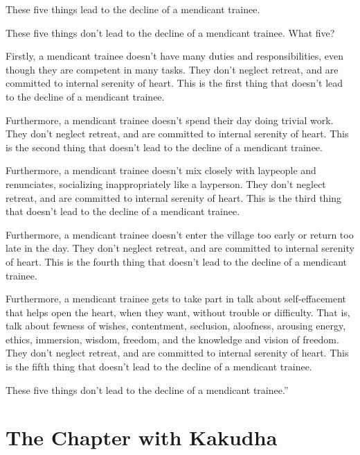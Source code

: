\documentclass[12pt,openany]{book}%
\let\oldcontentsline\contentsline
\newcommand{\nopagecontentsline}[3]{\oldcontentsline{#1}{#2}{}}
\newcommand*{\tocchapterline}[1]{\bfseries\itshape{#1}}
\begin{document}
These five things lead to the decline of a mendicant trainee. 

These five things don’t lead to the decline of a mendicant trainee. What five? 

Firstly, a mendicant trainee doesn’t have many duties and responsibilities, even though they are competent in many tasks. They don’t neglect retreat, and are committed to internal serenity of heart. This is the first thing that doesn’t lead to the decline of a mendicant trainee. 

Furthermore, a mendicant trainee doesn’t spend their day doing trivial work. They don’t neglect retreat, and are committed to internal serenity of heart. This is the second thing that doesn’t lead to the decline of a mendicant trainee. 

Furthermore, a mendicant trainee doesn’t mix closely with laypeople and renunciates, socializing inappropriately like a layperson. They don’t neglect retreat, and are committed to internal serenity of heart. This is the third thing that doesn’t lead to the decline of a mendicant trainee. 

Furthermore, a mendicant trainee doesn’t enter the village too early or return too late in the day. They don’t neglect retreat, and are committed to internal serenity of heart. This is the fourth thing that doesn’t lead to the decline of a mendicant trainee. 

Furthermore, a mendicant trainee gets to take part in talk about self-effacement that helps open the heart, when they want, without trouble or difficulty. That is, talk about fewness of wishes, contentment, seclusion, aloofness, arousing energy, ethics, immersion, wisdom, freedom, and the knowledge and vision of freedom. They don’t neglect retreat, and are committed to internal serenity of heart. This is the fifth thing that doesn't lead to the decline of a mendicant trainee. 

These five things don’t lead to the decline of a mendicant trainee.” 

%
\chapter*{The Chapter with Kakudha }
\addcontentsline{toc}{chapter}{\tocchapterline{The Chapter with Kakudha }}
\addtocontents{toc}{\let\protect\contentsline\protect\oldcontentsline}
\end{document}
